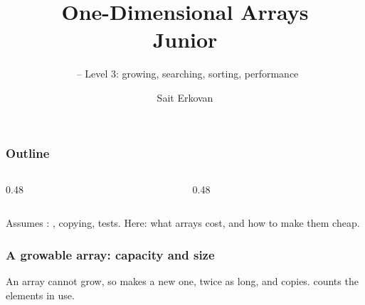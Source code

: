 \documentclass[aspectratio=169,10pt,compress]{beamer}
\title[Arrays 1D: Junior]{
	One-Dimensional Arrays\\
	Junior
}
\subtitle{
	\cisOOO\ -- Level 3: growing, searching, sorting, performance
}
\author[Erkovan]{Sait Erkovan}
\institute[FCIS]{
	Faculty of Computer and Information Sciences\\
	Yeditepe University
}
\date{{\tiny \hbTimeStamp}}
\begin{document}
\begin{frame}[t,fragile]
	\titlepage
\end{frame}




\begin{frame}[t,fragile] \frametitle{Outline}
	\begin{columns}[T]
		\begin{column}{0.48\textwidth}
			\tableofcontents[sections={1-4}, hideallsubsections]
		\end{column}
		\begin{column}{0.48\textwidth}
			\tableofcontents[sections={5-8}, hideallsubsections]
		\end{column}
	\end{columns}

	\vspace{1em}
	\small Assumes : , copying, tests.
	Here: what arrays cost, and how to make them cheap.
\end{frame}








\begin{frame}[t,fragile] \frametitle{A growable array: capacity and size}

	\small An array cannot grow, so  makes a new one, twice as long, and copies.
	 counts the elements in use.
\end{frame}
\end{document}
